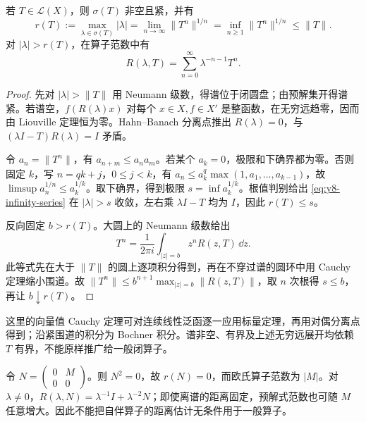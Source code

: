 \begin{theorem}[有界算子的谱与谱半径]\label{thm:y8-spectral-radius}
若 $T\in\mathcal L(X)$，则 $\sigma(T)$ 非空且紧，并有
\begin{equation}\label{eq:y8-spectral-radius}
 r(T):=\max_{\lambda\in\sigma(T)}|\lambda|
 =\lim_{n\to\infty}\|T^n\|^{1/n}
 =\inf_{n\ge1}\|T^n\|^{1/n}\le\|T\|.
\end{equation}
对 $|\lambda|>r(T)$，在算子范数中有
\begin{equation}\label{eq:y8-infinity-series}
 R(\lambda,T)=\sum_{n=0}^\infty\lambda^{-n-1}T^n.
\end{equation}
\end{theorem}
\begin{proof}
先对 $|\lambda|>\|T\|$ 用 Neumann 级数，得谱位于闭圆盘；由预解集开得谱紧。若谱空，$f(R(\lambda)x)$ 对每个 $x\in X,f\in X'$ 是整函数，在无穷远趋零，因而由 Liouville 定理恒为零。Hahn--Banach 分离点推出 $R(\lambda)=0$，与 $(\lambda I-T)R(\lambda)=I$ 矛盾。

令 $a_n=\|T^n\|$，有 $a_{n+m}\le a_na_m$。若某个 $a_k=0$，极限和下确界都为零。否则固定 $k$，写 $n=qk+j$，$0\le j<k$，有
$a_n\le a_k^q\max(1,a_1,\ldots,a_{k-1})$，故 $\limsup a_n^{1/n}\le a_k^{1/k}$。取下确界，得到极限 $s=\inf a_k^{1/k}$。根值判别给出 \eqref{eq:y8-infinity-series} 在 $|\lambda|>s$ 收敛，左右乘 $\lambda I-T$ 均为 $I$，因此 $r(T)\le s$。

反向固定 $b>r(T)$。大圆上的 Neumann 级数给出
\[
 T^n=\frac1{2\pi i}\int_{|z|=b}z^nR(z,T)\,\dd z.
\]
此等式先在大于 $\|T\|$ 的圆上逐项积分得到，再在不穿过谱的圆环中用 Cauchy 定理缩小围道。故
$\|T^n\|\le b^{n+1}\max_{|z|=b}\|R(z,T)\|$，取 $n$ 次根得 $s\le b$，再让 $b\downarrow r(T)$。
\end{proof}

这里的向量值 Cauchy 定理可对连续线性泛函逐一应用标量定理，再用对偶分离点得到；沿紧围道的积分为 Bochner 积分。谱非空、有界及上述无穷远展开均依赖 $T$ 有界，不能原样推广给一般闭算子。

\begin{example}[范数与谱半径相差很大]
令 $N=\left(\begin{smallmatrix}0&M\\0&0\end{smallmatrix}\right)$。则 $N^2=0$，故 $r(N)=0$，而欧氏算子范数为 $|M|$。对 $\lambda\ne0$，$R(\lambda,N)=\lambda^{-1}I+\lambda^{-2}N$；即使离谱的距离固定，预解式范数也可随 $M$ 任意增大。因此不能把自伴算子的距离估计无条件用于一般算子。
\end{example}

